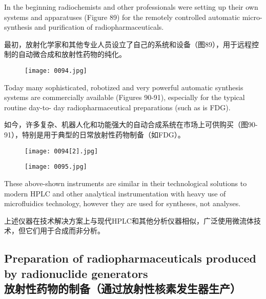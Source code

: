 \documentclass[dvipsnames, svgnames,a4paper,11pt]{article}
\begin{document}
In the beginning radiochemists and other professionals were setting up their own
systems and apparatuses (Figure 89) for the remotely controlled automatic micro-
synthesis and purification of radiopharmaceuticals.

最初，放射化学家和其他专业人员设立了自己的系统和设备（图89），用于远程控制的自动微合成和放射性药物的纯化。

\begin{figure}[H]
    \centering
    \texttt{[image: 0094.jpg]}
     \label{fig89}
\end{figure}

Today many sophisticated, robotized and very powerful automatic synthesis systems
are commercially available (Figures 90-91), especially for the typical routine day-to-
day radiopharmaceutical preparations (such as is FDG).

如今，许多复杂、机器人化和功能强大的自动合成系统在市场上可供购买（图90-91），特别是用于典型的日常放射性药物制备（如FDG）。

\begin{figure}[H]
    \centering
    \texttt{[image: 0094[2].jpg]}
     \label{fig90}
\end{figure}

\begin{figure}[H]
    \centering
    \texttt{[image: 0095.jpg]}
     \label{fig91}
\end{figure}

These above-shown instruments are similar in their technological solutions to
modern HPLC and other analytical instrumentation with heavy use of microfluidics
technology, however they are used for syntheses, not analyses.

上述仪器在技术解决方案上与现代HPLC和其他分析仪器相似，广泛使用微流体技术，但它们用于合成而非分析。

\subsection{Preparation of radiopharmaceuticals produced by radionuclide generators \\放射性药物的制备（通过放射性核素发生器生产）}
\end{document}
